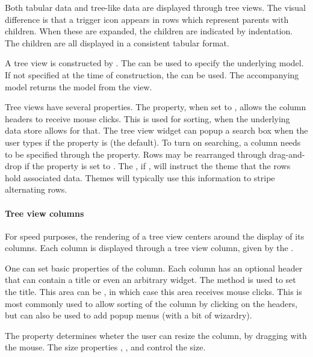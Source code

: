 Both tabular data and tree-like data are displayed through tree
views. The visual difference is that a trigger icon appears in rows which
represent parents with children. When these are expanded, the
children are indicated by indentation. The children are all displayed
in a consistent tabular format.

A tree view is constructed by . The
 can be used to specify the underlying
model. If not specified at the time of construction, the
 can be used. The accompanying
 model returns the model from the view.

Tree views have several properties. The 
property, when set to , allows the column headers to
receive mouse clicks. This is used for sorting, when the underlying
data store allows for that. The tree view widget can popup a search
box when the user types  if the property
 is  (the default). To turn on
searching, a column needs to be specified through the
 property. Rows may be rearranged through
drag-and-drop if the  property is set to
. The , if , will instruct the
theme that the rows hold associated data. Themes will typically use this
information to stripe alternating rows.


\paragraph{Tree view columns}
For speed purposes, the rendering of a tree view centers around the
display of its columns. Each column is displayed through a tree view
column, given by the .

One can set basic properties of the column. Each column has an
optional header that can contain a title or even an arbitrary
widget. The  method is used to set
the title. This area can be , in which case this area
receives mouse clicks. This is most commonly used to allow sorting of
the column by clicking on the headers, but can also be used to add
popup menus (with a bit of wizardry).

The property  determines wheter the user can resize
the column, by dragging with the mouse. The size properties
, , and  control the
size.

